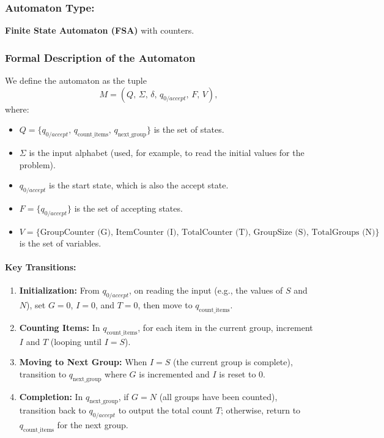 \documentclass[11pt]{article}
\begin{document}
\subsubsection*{Automaton Type:}
\textbf{Finite State Automaton (FSA)} with counters.

\subsubsection*{Formal Description of the Automaton}

We define the automaton as the tuple
\[
M = (Q,\, \Sigma,\, \delta,\, q_{0/accept},\, F,\, V),
\]
where:
\begin{itemize}
    \item \( Q = \{q_{0/accept},\, q_{\text{count\_items}},\, q_{\text{next\_group}}\} \) is the set of states.
    \item \(\Sigma\) is the input alphabet (used, for example, to read the initial values for the problem).
    \item \(q_{0/accept}\) is the start state, which is also the accept state.
    \item \( F = \{q_{0/accept}\} \) is the set of accepting states.
    \item \( V = \{\text{GroupCounter (G)},\, \text{ItemCounter (I)},\, \text{TotalCounter (T)},\, \text{GroupSize (S)},\, \text{TotalGroups (N)}\} \) is the set of variables.
\end{itemize}

\paragraph{Key Transitions:}
\begin{enumerate}
    \item \textbf{Initialization:} From \(q_{0/accept}\), on reading the input (e.g., the values of \(S\) and \(N\)), set \(G=0\), \(I=0\), and \(T=0\), then move to \(q_{\text{count\_items}}\).
    \item \textbf{Counting Items:} In \(q_{\text{count\_items}}\), for each item in the current group, increment \(I\) and \(T\) (looping until \(I=S\)).
    \item \textbf{Moving to Next Group:} When \(I=S\) (the current group is complete), transition to \(q_{\text{next\_group}}\) where \(G\) is incremented and \(I\) is reset to 0.
    \item \textbf{Completion:} In \(q_{\text{next\_group}}\), if \(G = N\) (all groups have been counted), transition back to \(q_{0/accept}\) to output the total count \(T\); otherwise, return to \(q_{\text{count\_items}}\) for the next group.
\end{enumerate}
\end{document}
